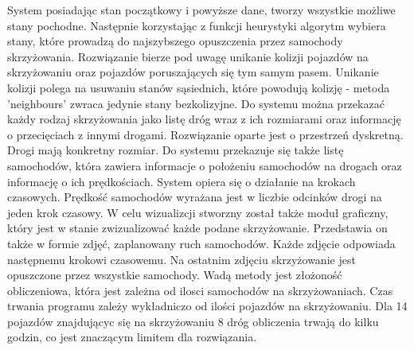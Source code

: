 System posiadając stan początkowy i powyższe dane, tworzy wszystkie możliwe stany pochodne. Następnie korzystając z funkcji heurystyki algorytm wybiera stany, które prowadzą do najszybszego opuszczenia przez samochody skrzyżowania.
\newline
\indent
Rozwiązanie bierze pod uwagę unikanie kolizji pojazdów na skrzyżowaniu oraz pojazdów poruszających się tym samym pasem. Unikanie kolizji polega na usuwaniu stanów sąsiednich, które powodują kolizję - metoda 'neighbours' zwraca jedynie stany bezkolizyjne.
\newline
\indent
Do systemu można przekazać każdy rodzaj skrzyżowania jako listę dróg wraz z ich rozmiarami oraz informację o przecięciach z innymi drogami. Rozwiązanie oparte jest o przestrzeń dyskretną. Drogi mają konkretny rozmiar. Do systemu przekazuje się także listę samochodów, która zawiera informacje o położeniu samochodów na drogach oraz informację o ich prędkościach. System opiera się o działanie na krokach czasowych. Prędkość samochodów wyrażana jest w liczbie odcinków drogi na jeden krok czasowy.
\newline
\indent
W celu wizualizcji stworzny został także moduł graficzny, który jest w stanie zwizualizować każde podane skrzyżowanie. Przedstawia on także w formie zdjęć, zaplanowany ruch samochodów. Każde zdjęcie odpowiada następnemu krokowi czasowemu. Na ostatnim zdjęciu skrzyżowanie jest opuszczone przez wszystkie samochody.
\newline
\indent
Wadą metody jest złożoność obliczeniowa, która jest zależna od ilosci samochodów na skrzyżowaniach. Czas trwania programu zależy wykładniczo od ilości pojazdów na skrzyżowaniu. Dla 14 pojazdów znajdującyc się na skrzyżowaniu 8 dróg obliczenia trwają do kilku godzin, co jest znaczącym limitem dla rozwiązania.

